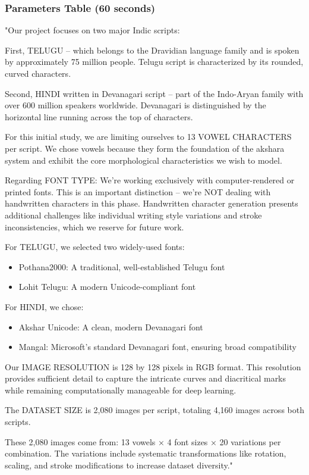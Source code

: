 \documentclass[11pt,a4paper]{article}
\begin{document}
\subsubsection*{Parameters Table (60 seconds)}
\begin{scriptbox}
"Our project focuses on two major Indic scripts:

First, TELUGU -- which belongs to the Dravidian language family and is spoken by approximately 75 million people. Telugu script is characterized by its rounded, curved characters.

Second, HINDI written in Devanagari script -- part of the Indo-Aryan family with over 600 million speakers worldwide. Devanagari is distinguished by the horizontal line running across the top of characters.

For this initial study, we are limiting ourselves to 13 VOWEL CHARACTERS per script. We chose vowels because they form the foundation of the akshara system and exhibit the core morphological characteristics we wish to model.

Regarding FONT TYPE: We're working exclusively with computer-rendered or printed fonts. This is an important distinction -- we're NOT dealing with handwritten characters in this phase. Handwritten character generation presents additional challenges like individual writing style variations and stroke inconsistencies, which we reserve for future work.

For TELUGU, we selected two widely-used fonts:
\begin{itemize}
\item Pothana2000: A traditional, well-established Telugu font
\item Lohit Telugu: A modern Unicode-compliant font
\end{itemize}

For HINDI, we chose:
\begin{itemize}
\item Akshar Unicode: A clean, modern Devanagari font
\item Mangal: Microsoft's standard Devanagari font, ensuring broad compatibility
\end{itemize}

Our IMAGE RESOLUTION is 128 by 128 pixels in RGB format. This resolution provides sufficient detail to capture the intricate curves and diacritical marks while remaining computationally manageable for deep learning.

The DATASET SIZE is 2,080 images per script, totaling 4,160 images across both scripts.

These 2,080 images come from: 13 vowels × 4 font sizes × 20 variations per combination. The variations include systematic transformations like rotation, scaling, and stroke modifications to increase dataset diversity."
\end{scriptbox}
\end{document}
